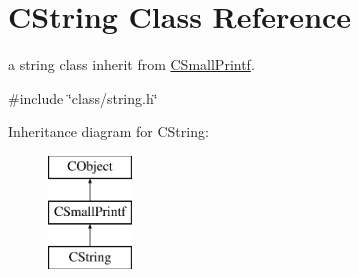 \hypertarget{class_c_string}{\section{C\-String Class Reference}
\label{class_c_string}
}


a string class inherit from \hyperlink{class_c_small_printf}{C\-Small\-Printf}.  




{\ttfamily \#include \char`\"{}class/string.\-h\char`\"{}}

Inheritance diagram for C\-String\-:\begin{figure}[H]
\begin{center}
\leavevmode
\includegraphics[height=3.000000cm]{class_c_string}
\end{center}
\end{figure}
